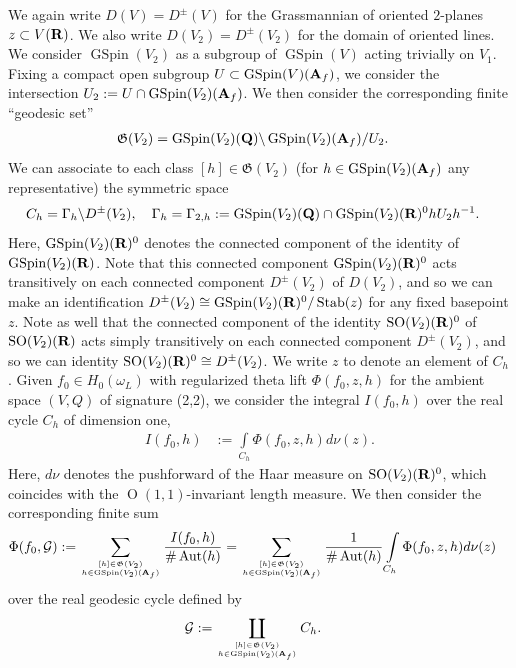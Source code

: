 \documentclass{amsart}
\theoremstyle{definition}
\begin{document}
We again write $D(V) = D^{\pm}(V)$ for the Grassmannian of oriented $2$-planes $z \subset V({\bf{R}})$.
We also write $D(V_2) = D^{\pm}(V_2)$ for the domain of oriented lines. 
We consider $\operatorname{GSpin}(V_2)$ as a subgroup of $\operatorname{GSpin}(V)$ acting trivially on $V_1$.
Fixing a compact open subgroup $U \subset \operatorname{GSpin}(V)({\bf{A}}_f)$, 
we consider the intersection $U_2 := U \cap \operatorname{GSpin}(V_2)({\bf{A}}_f)$. We then consider the corresponding finite ``geodesic set'' 
\begin{align*} \mathfrak{G}(V_2) &= \operatorname{GSpin}(V_2)({\bf{Q}}) \backslash \operatorname{GSpin}(V_2)({\bf{A}}_f)/U_2. \end{align*}
We can associate to each class $[h] \in \mathfrak{G}(V_{2})$ (for $h \in \operatorname{GSpin}(V_2)({\bf{A}}_f)$ any representative) the symmetric space
\begin{align*} C_h &= \Gamma_{h} \backslash D^{\pm}(V_{2}), 
\quad \Gamma_{h} = \Gamma_{2, h} := \operatorname{GSpin}(V_2)({\bf{Q}}) \cap \operatorname{GSpin}(V_{2})({\bf{R}})^0 h U_{2} h^{-1}. \end{align*} 
Here, $\operatorname{GSpin}(V_{2})({\bf{R}})^0$ denotes the connected component of the identity of $\operatorname{GSpin}(V_{2})({\bf{R}})$.
Note that this connected component $\operatorname{GSpin}(V_2)({\bf{R}})^0$ acts transitively on each connected component $D^{\pm}(V_{2})$ of $D(V_2)$,
and so we can make an identification $D^{\pm}(V_2) \cong \operatorname{GSpin}(V_{2})({\bf{R}})^0/\operatorname{Stab}(z)$ for any fixed basepoint $z$.
Note as well that the connected component of the identity $\operatorname{SO}(V_2)({\bf{R}})^0$ of $\operatorname{SO}(V_2)({\bf{R}})$ acts simply
transitively on each connected component $D^{\pm}(V_2)$, and so we can identity $\operatorname{SO}(V_2)({\bf{R}})^0 \cong D^{\pm}(V_2)$.
We write $z$ to denote an element of $C_h$. Given $f_0 \in H_{0}(\omega_L)$ with regularized theta lift $\Phi(f_0, z, h)$ for the ambient space 
$(V, Q)$ of signature (2,2), we consider the integral $I(f_0, h)$ over the real cycle $C_h$ of dimension one,
\begin{align*} I(f_0, h) &:= \int\limits_{C_h} \Phi(f_0, z, h) d \nu(z).\end{align*}
Here, $d \nu$ denotes the pushforward of the Haar measure on $\operatorname{SO}(V_2)({\bf{R}})^0$, 
which coincides with the $\operatorname{O}(1,1)$-invariant length measure. 
We then consider the corresponding finite sum
\begin{align*} \Phi(f_0, \mathcal{G}) &:= \sum\limits_{ [h] \in \mathfrak{G}(V_{2}) \atop h \in \operatorname{GSpin}(V_2)({\bf{A}}_f)} 
\frac{I(f_0, h)}{\# \operatorname{Aut}(h)} =  \sum\limits_{ [h] \in \mathfrak{G}(V_{2}) \atop h \in \operatorname{GSpin}(V_2)({\bf{A}}_f)} 
\frac{1}{\# \operatorname{Aut}(h)} \int\limits_{C_h} \Phi(f_0, z, h) d \nu (z) \end{align*} over the real geodesic cycle defined by 
\begin{align*} \mathcal{G} &:= \coprod\limits_{[h] \in \mathfrak{G}(V_2) \atop h \in \operatorname{GSpin}(V_2)({\bf{A}}_f)} C_h. \end{align*}
\end{document}
